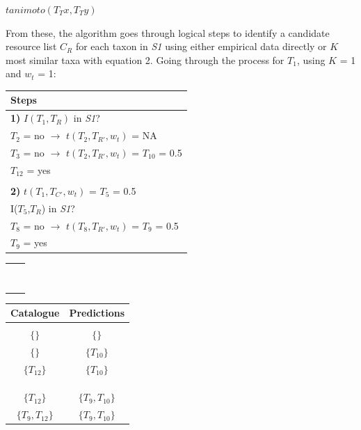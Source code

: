 \documentclass[letterpaper]{article}
\begin{document}
    \centerline{$tanimoto(T_Tx, T_Ty)$}
\bigskip

From these, the algorithm goes through logical steps to identify a candidate resource list $C_R$ for each taxon in \textit{S1} using either empirical data directly or $K$ most similar taxa with equation 2. Going through the process for $T_1$, using $K$ = 1 and $w_t$ = 1:
\bigskip

\begin{table}[h!]
  \centering
  \begin{tabular}{l}
      Steps \\
      \hline
      \textbf{1)} $I(T_1,T_R)$ in \textit{S1}? \\
      $T_2$ = no $\rightarrow$ $t(T_2, T_{R'}, w_t)$ = NA   \\
      $T_3$ = no $\rightarrow$ $t(T_2, T_{R'}, w_t)$ = $T_{10}$ = 0.5 \\
      $T_{12}$ = yes    \\  \\
      \textbf{2)} $t(T_1, T_{C'}, w_t)$ = $T_5$ = 0.5            \\
      I($T_5$,$T_R$) in \textit{S1}? \\
      $T_8$ = no $\rightarrow$ $t(T_8, T_{R'}, w_t)$ = $T_9$ = 0.5  \\
      $T_9$ = yes   \\
  \end{tabular}
  \quad
  \begin{tabular}{c|c}
      \\  \\  \\  \\  \\  \\  \\  \\  \\
  \end{tabular}
  \quad
  \begin{tabular}{cc}
      Catalogue   & Predictions \\
      \hline \\
      $\{\}$    & $\{\}$            \\
      $\{\}$    & $\{T_{10}\}$      \\
      $\{T_{12}\}$    & $\{T_{10}\}$      \\  \\  \\ \\
      $\{T_{12}\}$    & $\{T_9, T_{10}\}$      \\
      $\{T_9, T_{12}\}$    & $\{T_9, T_{10}\}$      \\
  \end{tabular}
\end{table}
\bigskip
\end{document}
